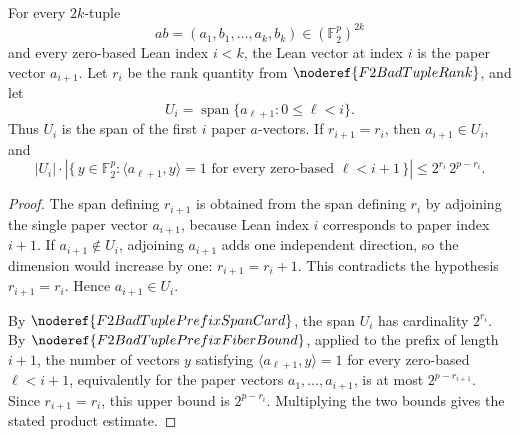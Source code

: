 \begin{helper}
For every \(2k\)-tuple
\[
  ab=(a_1,b_1,\ldots,a_k,b_k)\in(\mathbb F_2^p)^{2k}
\]
and every zero-based Lean index \(i<k\), the Lean vector at index \(i\) is the
paper vector \(a_{i+1}\). Let \(r_i\) be the rank quantity from
\(\noderef{F2BadTupleRank}\), and let
\[
  U_i=\operatorname{span}\{a_{\ell+1}:0\le \ell<i\}.
\]
Thus \(U_i\) is the span of the first \(i\) paper \(a\)-vectors. If
\(r_{i+1}=r_i\), then \(a_{i+1}\in U_i\), and
\[
  |U_i|\cdot
  \left|\{\,y\in\mathbb F_2^p:\langle a_{\ell+1},y\rangle=1
      \text{ for every zero-based }\ell<i+1\,\}\right|
  \le
  2^{r_i}\,2^{p-r_i}.
\]
\end{helper}
\begin{proof}
The span defining \(r_{i+1}\) is obtained from the span defining \(r_i\) by
adjoining the single paper vector \(a_{i+1}\), because Lean index \(i\)
corresponds to paper index \(i+1\). If \(a_{i+1}\notin U_i\), adjoining
\(a_{i+1}\) adds one independent direction, so the dimension would increase by
one: \(r_{i+1}=r_i+1\). This contradicts the hypothesis \(r_{i+1}=r_i\). Hence
\(a_{i+1}\in U_i\).

By \(\noderef{F2BadTuplePrefixSpanCard}\), the span \(U_i\) has cardinality
\(2^{r_i}\). By \(\noderef{F2BadTuplePrefixFiberBound}\), applied to the prefix
of length \(i+1\), the number of vectors \(y\) satisfying
\(\langle a_{\ell+1},y\rangle=1\) for every zero-based \(\ell<i+1\), equivalently
for the paper vectors \(a_1,\ldots,a_{i+1}\), is at most \(2^{p-r_{i+1}}\).
Since \(r_{i+1}=r_i\), this upper bound is \(2^{p-r_i}\). Multiplying the two
bounds gives the stated product estimate.
\end{proof}
